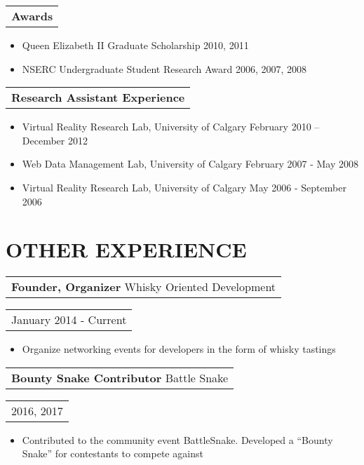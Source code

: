 \documentclass{resume}
\begin{document}
\begin{resume}
    \begin{tabular}[t]{@{}l}
       {\bf Awards  }
    \end{tabular}\vspace{+0.05in}
    \begin{itemize} \itemsep -2pt
    \item Queen Elizabeth II Graduate Scholarship  	2010, 2011
    \item NSERC Undergraduate Student Research Award	2006, 2007, 2008
    \end{itemize}

    \begin{tabular}[t]{@{}l}
        {\bf Research Assistant Experience  }
    \end{tabular}\vspace{+0.05in}
    \begin{itemize} \itemsep -2pt
    \item Virtual Reality Research Lab, University of Calgary	February 2010 – December 2012
    \item Web Data Management Lab, University of Calgary	February 2007 - May 2008
    \item Virtual Reality Research Lab, University of Calgary	 May 2006 - September 2006
    \end{itemize}



\section{OTHER EXPERIENCE}
    \vspace{+0.1in}
    \begin{tabular}[t]{@{}l}
        {\bf Founder, Organizer   } Whisky Oriented Development
    \end{tabular}\vspace{+0.05in}
    \hfill
    \begin{tabular}[t]{l@{}}
        January 2014 - Current
    \end{tabular}
    \begin{itemize} \itemsep -2pt
    \item Organize networking events for developers in the form of whisky tastings
    \end{itemize}

    \begin{tabular}[t]{@{}l}
        {\bf Bounty Snake Contributor   } Battle Snake
    \end{tabular}\vspace{+0.05in}
    \hfill
    \begin{tabular}[t]{l@{}}
        2016, 2017
    \end{tabular}
    \begin{itemize} \itemsep -2pt
    \item Contributed to the community event BattleSnake. Developed a “Bounty Snake” for contestants to compete against
    \end{itemize}

\end{resume}
\end{document}
